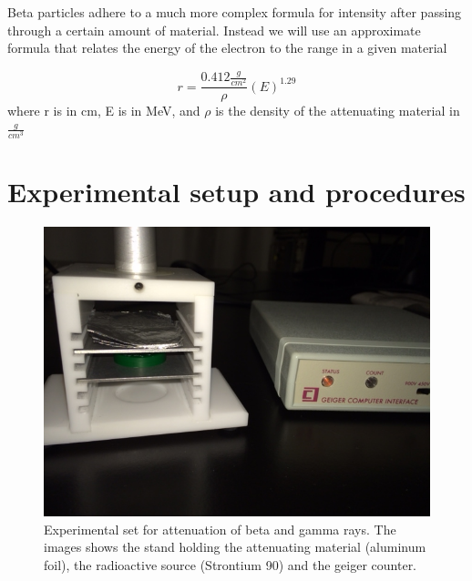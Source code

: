 \documentclass[twocolumn,secnumarabic,amssymb, nobibnotes, aps, pra]{revtex4}
\begin{document}
Beta particles adhere to a much more complex formula for intensity after passing through a certain amount of material.  Instead we will use an approximate formula that relates the energy of the electron to the range in a given material

\begin{equation}
r = \frac{0.412 \frac{g}{cm^2}}{\rho} (E)^{1.29}
\label{eq:beta}   %
\end{equation}
where r is in cm, E is in MeV, and  $\rho$ is the density of the attenuating material in $\frac{g}{cm^3}$


\section{Experimental setup and procedures}


\begin{figure}[h]
\includegraphics[scale=0.4,angle=180]{Setup.jpg}%
\caption{Experimental set for attenuation of beta and gamma rays.  The images shows the stand holding the attenuating material (aluminum foil), the radioactive source (Strontium 90) and the geiger counter. }
\label{fig:setup}
\end{figure}
\end{document}
